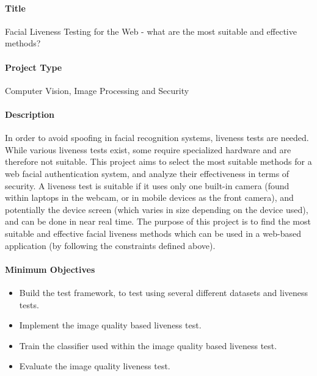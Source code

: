 \documentclass{article}
\begin{document}
    
    \paragraph{Title}
        Facial Liveness Testing for the Web - what are the most suitable and effective methods?
    \paragraph{Project Type}
        Computer Vision, Image Processing and Security
    \paragraph{Description}
    In order to avoid spoofing in facial recognition systems, liveness tests are needed. While various liveness tests exist,
    some require specialized hardware and are therefore not suitable. This project aims to select the most suitable methods for
    a web facial authentication system, and analyze their effectiveness in terms of security. A liveness test is suitable if it
    uses only one built-in camera (found within laptops in the webcam, or in mobile devices as the front camera), and potentially
    the device screen (which varies in size depending on the device used), and can be done in near real time. The purpose of this
    project is to find the most suitable and effective facial liveness methods which can be used in a web-based application (by following
    the constraints defined above).
    \paragraph{Minimum Objectives}
        \begin{itemize}
            \item Build the test framework, to test using several different datasets and liveness tests.
            \item Implement the image quality based liveness test.
            \item Train the classifier used within the image quality based liveness test.
            \item Evaluate the image quality liveness test.
        \end{itemize}
\end{document}

